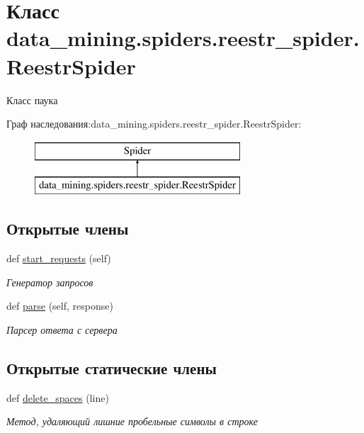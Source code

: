 \hypertarget{classdata__mining_1_1spiders_1_1reestr__spider_1_1ReestrSpider}{}\section{Класс data\+\_\+mining.\+spiders.\+reestr\+\_\+spider.\+Reestr\+Spider}
\label{classdata__mining_1_1spiders_1_1reestr__spider_1_1ReestrSpider}


Класс паука  


Граф наследования\+:data\+\_\+mining.\+spiders.\+reestr\+\_\+spider.\+Reestr\+Spider\+:\begin{figure}[H]
\begin{center}
\leavevmode
\includegraphics[height=2.000000cm]{classdata__mining_1_1spiders_1_1reestr__spider_1_1ReestrSpider}
\end{center}
\end{figure}
\subsection*{Открытые члены}
\begin{DoxyCompactItemize}
\item 
def \hyperlink{classdata__mining_1_1spiders_1_1reestr__spider_1_1ReestrSpider_a5c4b518f8df543751ea7f9ecef4e7196}{start\+\_\+requests} (self)
\begin{DoxyCompactList}\small\item\em Генератор запросов \end{DoxyCompactList}\item 
def \hyperlink{classdata__mining_1_1spiders_1_1reestr__spider_1_1ReestrSpider_a9b11b00b7a706fe10bc7b6cb4c4f38e5}{parse} (self, response)
\begin{DoxyCompactList}\small\item\em Парсер ответа с сервера \end{DoxyCompactList}\end{DoxyCompactItemize}
\subsection*{Открытые статические члены}
\begin{DoxyCompactItemize}
\item 
def \hyperlink{classdata__mining_1_1spiders_1_1reestr__spider_1_1ReestrSpider_aa3210a5e3ec964c5a1bbc301f72d101c}{delete\+\_\+spaces} (line)
\begin{DoxyCompactList}\small\item\em Метод, удаляющий лишние пробельные символы в строке \end{DoxyCompactList}\end{DoxyCompactItemize}
